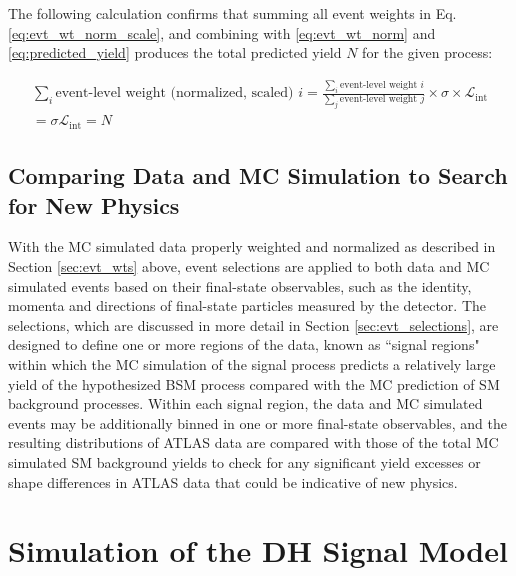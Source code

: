 \noindent The following calculation confirms that summing all event weights in Eq. \ref{eq:evt_wt_norm_scale}, and combining with \ref{eq:evt_wt_norm} and \ref{eq:predicted_yield} produces the total predicted yield \(N\) for the given process:

\begin{multline}
\label{eq:evt_wt_sum}
\sum_i\text{event-level weight (normalized, scaled) }i = \frac{\sum_i \text{event-level weight }i}{\sum_j \text{event-level weight }j}\times \sigma \times \mathcal{L}_\text{int} \\
 = \sigma\mathcal{L}_\text{int} = N
\end{multline}

\subsection{Comparing Data and MC Simulation to Search for New Physics}

With the MC simulated data properly weighted and normalized as described in Section \ref{sec:evt_wts} above, event selections are applied to both data and MC simulated events based on their final-state observables, such as the identity, momenta and directions of final-state particles measured by the detector. The selections, which are discussed in more detail in Section \ref{sec:evt_selections}, are designed to define one or more regions of the data, known as ``signal regions" within which the MC simulation of the signal process predicts a relatively large yield of the hypothesized BSM process compared with the MC prediction of SM background processes. Within each signal region, the data and MC simulated events may be additionally binned in one or more final-state observables, and the resulting distributions of ATLAS data are compared with those of the total MC simulated SM background yields to check for any significant yield excesses or shape differences in ATLAS data that could be indicative of new physics.

\section{Simulation of the DH Signal Model}
\label{sec:DH_model_sim}

